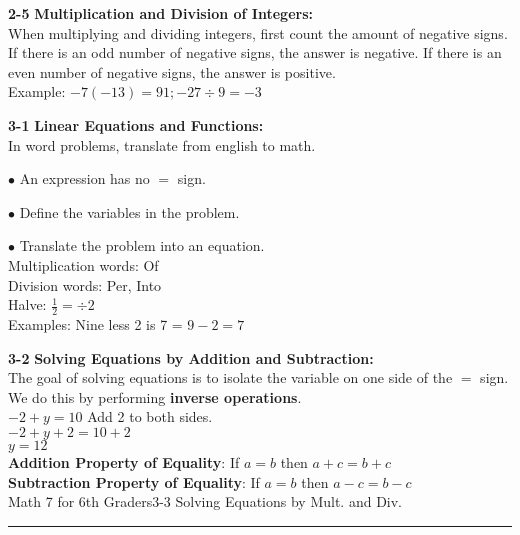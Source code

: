 \begin{enumerate*}
		\item[\Large\textbf{2-5}] \Large\textbf{Multiplication and Division of Integers:}\\
			When multiplying and dividing integers, first count the amount of negative signs.\\
			If there is an odd number of negative signs, the answer is negative. If there is an even number of negative signs, the answer is positive.\\
			Example: $-7(-13)=91; -27\div9=-3$\\
			
		\item[\Large\textbf{3-1}] \Large\textbf{Linear Equations and Functions:}\\
			In word problems, translate from english to math.
			\begin{enumerate*}
			 \item[$\bullet$]An expression has no $=$ sign.
			 \item[$\bullet$]Define the variables in the problem.
			 \item[$\bullet$]Translate the problem into an equation.\\
			 Multiplication words: Of\\
			 Division words: Per, Into\\
			 Halve: $\frac{1}{2}=\div2$\\
			 Examples: Nine less 2 is 7 = $9-2=7$\\
			 \end{enumerate*}
			 
		\item[\Large\textbf{3-2}] \Large\textbf{Solving Equations by Addition and Subtraction:}\\
			The goal of solving equations is to isolate the variable on one side of the $=$ sign. We do this by performing \textbf{inverse operations}.\\
			$-2+y=10$ Add 2 to both sides.\\$-2+y+2=10+2$\\$y=12$\\
			\textbf{Addition Property of Equality}: If $a=b$ then $a+c=b+c$\\
			\textbf{Subtraction Property of Equality}: If $a=b$ then $a-c=b-c$\\
		
\newpage
\noindent\Large{Math 7 for 6th Graders\hfill 3-3 Solving Equations by Mult. and Div.}
\noindent\hrule
\vspace{5mm}
				

\end{enumerate*}
